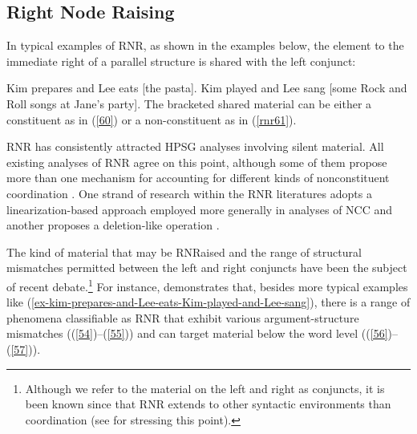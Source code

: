 {\subsection{Right Node Raising}

In typical examples of RNR, as shown in the examples below, the element to the immediate right of a parallel structure is shared with the left conjunct:

\eal
\label{ex-kim-prepares-and-Lee-eats-Kim-played-and-Lee-sang}
\ex  Kim prepares and Lee eats [the pasta].  \label{60}
\ex  Kim played and Lee sang [some Rock and Roll songs at Jane's party]. \label{rnr61}
\zl
%
The bracketed shared material can be either a constituent as in (\ref{60}) or a non-constituent as in (\ref{rnr61}).

RNR has consistently attracted HPSG analyses involving silent material.
All existing analyses of RNR \citep{Abeille2016, Beavers2004, Chaves2008-in-lexicon, Chaves2014, Crysmann2003, Shiraishi2019, Yatabe2001, Yatabe2012} agree on this point,
although some of them propose more than one mechanism for accounting for different kinds of nonconstituent coordination \citep{Chaves2014, Yatabe2001, Yatabe2012, Yatabe2019}. One strand of research within the RNR literatures adopts a linearization-based approach employed more generally in analyses of NCC \citep{Yatabe2001, Yatabe2012} and another proposes a deletion-like operation \citep{Abeille2016, Chaves2014, Shiraishi2019}.

%

The kind of material that may be RNRaised and the range of structural mismatches permitted between the left and right conjuncts have been the subject of recent debate.\footnote{Although we refer to the material on the left and right as conjuncts, it is been known since \citet{Hudson1976, Hudson1989} that RNR extends to other syntactic environments than coordination (see \citealt{Chaves2014} for stressing this point).} For instance, \citet[839--840]{Chaves2014} demonstrates that, besides more typical examples like (\ref{ex-kim-prepares-and-Lee-eats-Kim-played-and-Lee-sang}),
 there is a range of phenomena classifiable as RNR that exhibit various argument-structure mismatches ((\ref{54})--(\ref{55})) and can target material below the word level ((\ref{56})--(\ref{57})).
%

}
